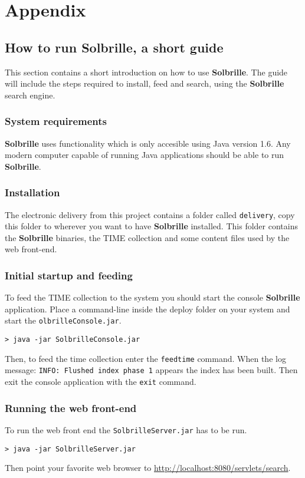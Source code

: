 \chapter{Appendix}
\thispagestyle{fancy}
\section{How to run {\bf Solbrille}, a short guide}\label{sec:how_to_run}
This section contains a short introduction on how to use {\bf Solbrille}. The guide will include the steps required to install, feed and search, using the {\bf Solbrille} search engine. 

\subsection{System requirements}\label{sub:system_requirements}
{\bf Solbrille} uses functionality which is only accesible using Java version 1.6. Any modern computer capable of running Java applications should be able to run {\bf Solbrille}.  

\subsection{Installation}\label{sub:installation}
The electronic delivery from this project contains a folder called \texttt{delivery}, copy this folder to wherever you want to have {\bf Solbrille} installed. This folder contains the {\bf Solbrille} binaries, the TIME collection and some content files used by the web front-end.

\subsection{Initial startup and feeding}\label{sub:initial_startup_and_feeding}
To feed the TIME collection to the system you should start the console {\bf Solbrille} application. Place a command-line inside the deploy folder on your system and start the \texttt{olbrilleConsole.jar}.

\begin{verbatim} 
> java -jar SolbrilleConsole.jar
\end{verbatim} 

Then, to feed the time collection enter the \texttt{feedtime} command. When the log message: \texttt{INFO: Flushed index phase 1} appears the index has been built. Then exit the console application with the \texttt{exit} command. 

\subsection{Running the web front-end}\label{sub:running_the_web_front_end}
To run the web front end the \texttt{SolbrilleServer.jar} has to be run. 

\begin{verbatim} 
> java -jar SolbrilleServer.jar
\end{verbatim}

Then point your favorite web browser to \url{http://localhost:8080/servlets/search}. 
